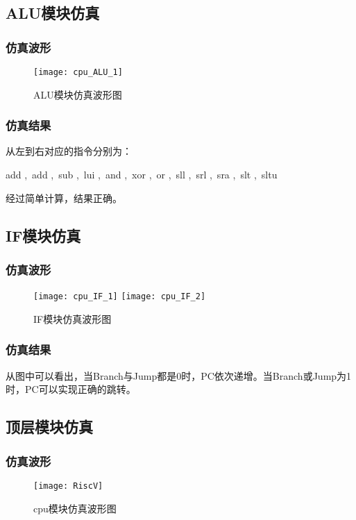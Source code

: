 \documentclass{../source/Experiment}
\begin{document}
        \subsection{ALU模块仿真}
            \subsubsection{仿真波形}
                \begin{figure}[H]
                    \centering
                    \texttt{[image: cpu\_ALU\_1]}
                    \caption{ALU模块仿真波形图}
                \end{figure}               
            \subsubsection{仿真结果}
            从左到右对应的指令分别为：

            add ,\,  add ,\,  sub ,\,  lui ,\,  and ,\,  xor ,\,  or ,\,  sll ,\,  srl ,\,  sra ,\,  slt ,\,  sltu

            经过简单计算，结果正确。

        \subsection{IF模块仿真}
            \subsubsection{仿真波形}
                \begin{figure}[H]
                    \centering
                    \texttt{[image: cpu\_IF\_1]}
                    \texttt{[image: cpu\_IF\_2]}
                    \caption{IF模块仿真波形图}
                \end{figure}    
            \subsubsection{仿真结果}
            从图中可以看出，当Branch与Jump都是0时，PC依次递增。当Branch或Jump为1时，PC可以实现正确的跳转。

        \subsection{顶层模块仿真}
            \subsubsection{仿真波形}
                \begin{figure}[H]
                    \centering
                    \texttt{[image: RiscV]}
                    \caption{cpu模块仿真波形图}
                \end{figure} 
\end{document}

